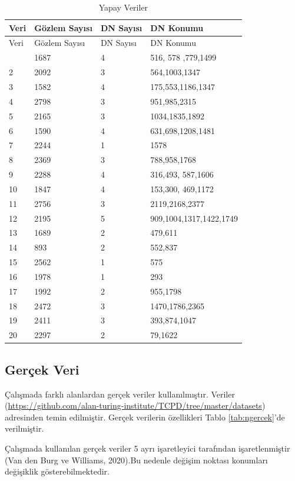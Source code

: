 \documentclass[12pt,twoside]{deuthesis}
\begin{document}
\begin{longtable}[]{@{}llll@{}}
\caption{\label{tab:nvar1} Yapay Veriler}\tabularnewline
\toprule\noalign{}
Veri & Gözlem Sayısı & DN Sayısı & DN Konumu \\
\midrule\noalign{}
\endfirsthead
\toprule\noalign{}
Veri & Gözlem Sayısı & DN Sayısı & DN Konumu \\
\midrule\noalign{}
\endhead
\bottomrule\noalign{}
\endlastfoot
1 & 1687 & 4 & 516, 578 ,779,1499 \\
2 & 2092 & 3 & 564,1003,1347 \\
3 & 1582 & 4 & 175,553,1186,1347 \\
4 & 2798 & 3 & 951,985,2315 \\
5 & 2165 & 3 & 1034,1835,1892 \\
6 & 1590 & 4 & 631,698,1208,1481 \\
7 & 2244 & 1 & 1578 \\
8 & 2369 & 3 & 788,958,1768 \\
9 & 2288 & 4 & 316,493, 587,1606 \\
10 & 1847 & 4 & 153,300, 469,1172 \\
11 & 2756 & 3 & 2119,2168,2377 \\
12 & 2195 & 5 & 909,1004,1317,1422,1749 \\
13 & 1689 & 2 & 479,611 \\
14 & 893 & 2 & 552,837 \\
15 & 2562 & 1 & 575 \\
16 & 1978 & 1 & 293 \\
17 & 1992 & 2 & 955,1798 \\
18 & 2472 & 3 & 1470,1786,2365 \\
19 & 2411 & 3 & 393,874,1047 \\
20 & 2297 & 2 & 79,1622 \\
\end{longtable}

\subsection{Gerçek Veri}\label{geruxe7ek-veri}

Çalışmada farklı alanlardan gerçek veriler kullanılmıştır. Veriler (\url{https://github.com/alan-turing-institute/TCPD/tree/master/datasets}) adresinden temin edilmiştir. Gerçek verilerin özellikleri Tablo \ref{tab:ngercek}'de verilmiştir.

Çalışmada kullanılan gerçek veriler 5 ayrı işaretleyici tarafından işaretlenmiştir (Van den Burg ve Williams, 2020).Bu nedenle değişim noktası konumları değişiklik gösterebilmektedir.
\end{document}
